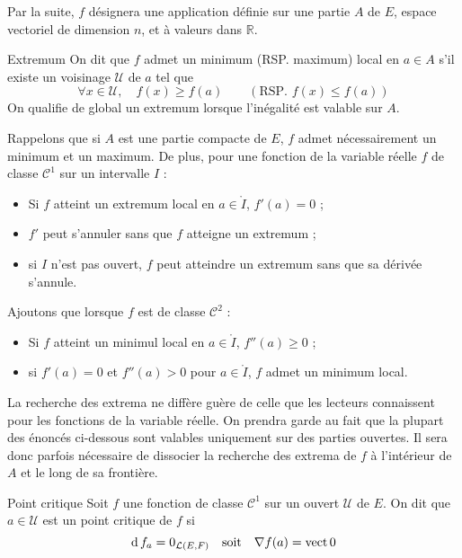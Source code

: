     Par la suite, $f$ désignera une application définie sur une partie $A$ de $E$, espace vectoriel de dimension $n$, et à valeurs dans $\mathbb{R}$. 

    \begin{defi}{Extremum}{}
        On dit que $f$ admet un minimum (RSP. maximum)  local en $a \in A$ s’il existe un voisinage $\mathcal{U}$ de $a$ tel que 
        \[ \forall x \in \mathcal{U}, \quad f(x) \geq f(a) \qquad (\text{RSP. } f(x) \leq f(a)) \]    
        On qualifie de global un extremum lorsque l’inégalité est valable sur $A$.        
    \end{defi}

    Rappelons que si $A$ est une partie compacte de $E$, $f$ admet nécessairement un minimum et un maximum. De plus, pour une fonction de la variable réelle $f$ de classe $\mathcal{C}^1$ sur un intervalle $I$ :
    \begin{itemize}
        \item Si $f$ atteint un extremum local en $a \in \mathring{I}$, $f'(a) = 0$ ;
        \item $f'$ peut s’annuler sans que $f$ atteigne un extremum ;
        \item si $I$ n’est pas ouvert, $f$ peut atteindre un extremum sans que sa dérivée s’annule.
    \end{itemize}
    Ajoutons que lorsque $f$ est de classe $\mathcal{C}^2$ :
    \begin{itemize}
        \item Si $f$ atteint un minimul local en $a \in \mathring{I}$, $f''(a) \geq 0$ ;
        \item si $f'(a) = 0$ et $f''(a) > 0$ pour $a \in \mathring{I}$, $f$ admet un minimum local.
    \end{itemize}

    La recherche des extrema ne diffère guère de celle que les lecteurs connaissent pour les fonctions de la variable réelle. On prendra garde au fait que la plupart des énoncés ci-dessous sont valables uniquement sur des parties ouvertes. Il sera donc parfois nécessaire de dissocier la recherche des extrema de $f$ à l’intérieur de $A$ et le long de sa frontière.

    \begin{defi}{Point critique}
        Soit $f$ une fonction de classe $\mathcal{C}^1$ sur un ouvert $\mathcal{U}$ de $E$. On dit que $a \in \mathcal{U}$ est un point critique de $f$ si 
        \[ \operatorname{d} f_a = 0_{\mathcal{L}(E,F)} \quad \text{soit} \quad \nabla f(a) = \operatorname{vect}{0} \]   
    \end{defi}

